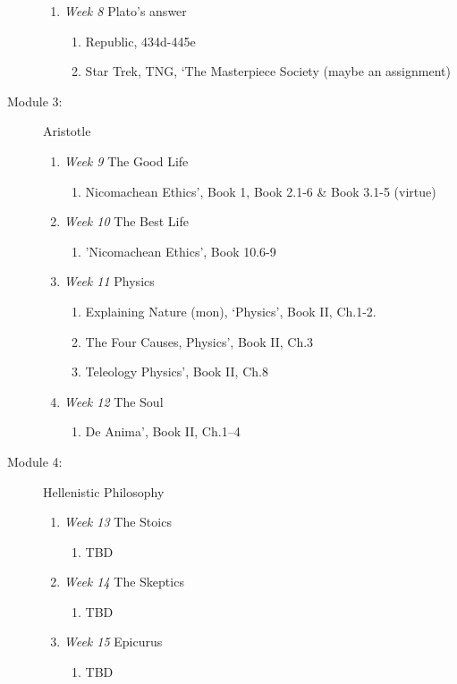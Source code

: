 \documentclass[article,oneside]{memoir}
\begin{document}
\begin{description}
\begin{enumerate}
\item \textit{Week 8} Plato's answer
\begin{enumerate}
\item Republic, 434d-445e
\item Star Trek, TNG, `The Masterpiece Society (maybe an assignment)
\end{enumerate}
\end{enumerate}

\item[Module 3:] Aristotle
\begin{enumerate}
\item \textit{Week 9}  The Good Life
\begin{enumerate}
\item Nicomachean Ethics', Book 1, Book 2.1-6 \& Book 3.1-5 (virtue)
\end{enumerate}
\item  \textit{Week 10} The Best Life
\begin{enumerate}
\item 'Nicomachean Ethics', Book 10.6-9
\end{enumerate}

\item \textit{Week 11} Physics
\begin{enumerate}
\item Explaining Nature (mon), `Physics', Book II, Ch.1-2. 
\item The Four Causes, Physics', Book II, Ch.3
\item Teleology Physics', Book II, Ch.8
\end{enumerate}
\item \textit{Week 12} The Soul
\begin{enumerate}
\item De Anima', Book II, Ch.1--4
\end{enumerate}
\end{enumerate}

\item[Module 4:] Hellenistic Philosophy
\begin{enumerate} 
\item \textit{Week 13} The Stoics
\begin{enumerate}
\item TBD
\end{enumerate}
\item \textit{Week 14} The Skeptics
\begin{enumerate}
 \item TBD
\end{enumerate}
\item \textit{Week 15} Epicurus
\begin{enumerate}
\item TBD
\end{enumerate}
\end{enumerate}
\end{description}
\end{document}
